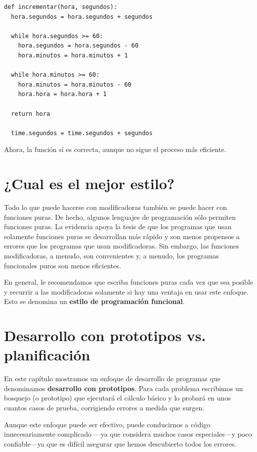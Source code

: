 \beforeverb
\begin{verbatim}
def incrementar(hora, segundos):
  hora.segundos = hora.segundos + segundos

  while hora.segundos >= 60:
    hora.segundos = hora.segundos - 60
    hora.minutos = hora.minutos + 1

  while hora.minutos >= 60:
    hora.minutos = hora.minutos - 60
    hora.hora = hora.hora + 1

  return hora

  time.segundos = time.segundos + segundos

\end{verbatim}
\afterverb
%
Ahora, la función sí es correcta, aunque no sigue el proceso
 más eficiente. 

\section{¿Cual es el mejor estilo?}


Todo lo que puede hacerse con modificadoras también se 
puede hacer con funciones puras. De hecho, algunos lenguajes
de programación sólo permiten funciones puras. La evidencia
apoya la tesis de que los programas que usan solamente 
funciones puras se desarrollan más rápido y son menos
propensos a errores que los programas que usan modificadoras.
Sin embargo, las funciones modificadoras, a menudo, son 
convenientes y, a menudo, los programas funcionales puros
son menos eficientes.

En general, le recomendamos que escriba funciones puras 
cada vez que sea posible y recurrir a las modificadoras
solamente si hay una ventaja en usar este enfoque. Esto
se denomina un {\bf estilo de programación funcional}.


\section{Desarrollo con prototipos vs. planificación}
\label{convert}

En este capítulo mostramos un enfoque de desarrollo de 
programas que denominamos  {\bf desarrollo con prototipos}. 
Para cada problema escribimos un bosquejo  (o prototipo) que
ejecutará el cálculo básico y lo probará en unos cuantos
casos de prueba, corrigiendo errores a medida que surgen.

Aunque este enfoque puede ser efectivo, puede conducirnos
a código innecesariamente complicado ---ya que considera
muchos casos especiales---y poco confiable---ya que es
difícil asegurar que hemos descubierto todos los errores.

